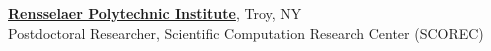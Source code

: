 \noindent \href{https://www.rpi.edu}{\textbf{Rensselaer Polytechnic Institute}}, Troy, NY  \hfill{}\\
Postdoctoral Researcher,
Scientific Computation Research Center (SCOREC)
\vspace{.1 in}\\

